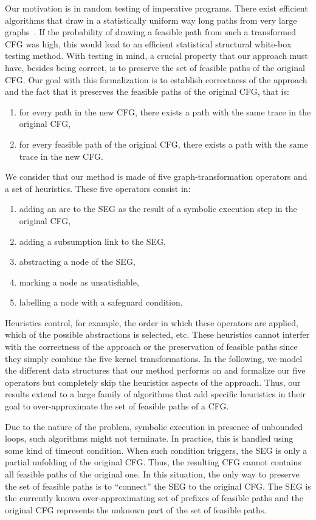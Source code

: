 Our motivation is in random testing of imperative programs. There exist efficient algorithms that 
draw in a statistically uniform way long paths from very large graphs~\cite{Denise2011}. If the 
probability of drawing a feasible path from such a transformed CFG was high, this would lead to an 
efficient statistical structural white-box testing method. With testing in mind, a crucial 
property that our approach must have, besides being correct, is to preserve the set of feasible 
paths of the original CFG. Our goal with this formalization is to establish correctness of the 
approach and the fact that it preserves the feasible paths of the original CFG, that is:
\begin{enumerate}
  \item for every path in the new CFG, there exists a path with the same trace in the original CFG,
  \item for every feasible path of the original CFG, there exists a path with the same trace in 
the new CFG.
\end{enumerate}

We consider that our method is made of five graph-transformation operators and a set of 
heuristics. These five operators consist in:
\begin{enumerate}
  \item adding an arc to the SEG as the result of a symbolic execution step in the
    original CFG,
  \item adding a subsumption link to the SEG,
  \item abstracting a node of the SEG,
  \item marking a node as unsatisfiable,
  \item labelling a node with a safeguard condition.
\end{enumerate} 
Heuristics control, for example, the order in which these operators
are applied, which of the possible
abstractions is selected, etc. These heuristics cannot interfer with the 
correctness of the approach or the preservation of feasible paths since they
simply combine the five kernel transformations. In the following, 
we model the different data structures that our method performs on and formalize our five 
operators but completely skip the heuristics aspects of the approach. Thus, our results extend to a 
large family of algorithms that add specific heuristics in their goal to over-approximate the 
set of feasible paths of a CFG.

Due to the nature of the problem, symbolic execution in presence of unbounded loops, such algorithms 
might not terminate. In practice, this is handled using some kind of timeout condition. When such 
condition triggers, the SEG is only a partial unfolding of the original CFG. Thus, the resulting 
CFG cannot contains all feasible paths of the original one. In this situation, the only way to 
preserve the set of feasible paths is to ``connect'' the SEG to the original CFG. The SEG is the currently 
known over-approximating set of prefixes of feasible paths and the original CFG represents the 
unknown part of the set of feasible paths. 

